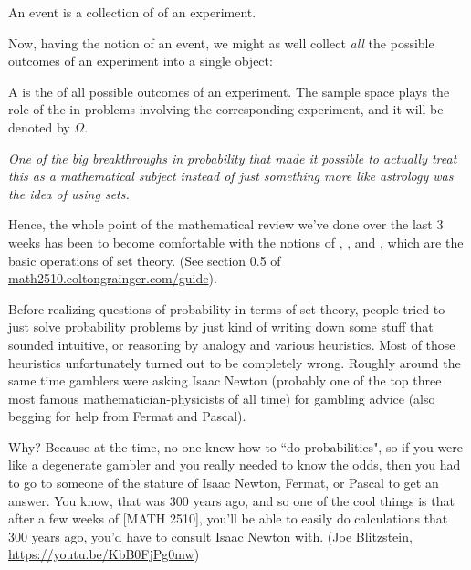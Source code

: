 \documentclass{ccg-topic}
\begin{document}
\begin{defn}[Event]
    An event is a collection of  of an experiment.
\end{defn}

Now, having the notion of an event, we might as well collect \emph{all} the possible outcomes of an experiment into a single object:

\begin{defn}
    \label{defn:sample_space}
    A  is the  of all possible outcomes of an experiment. The sample space plays the role of the  in problems involving the corresponding experiment, and it will be denoted by $\Omega$. 
\end{defn}

\begin{note}
    \emph{One of the big breakthroughs in probability that made it possible to actually treat this as a mathematical subject instead of just something more like astrology was the idea of using sets.}
\end{note}

Hence, the whole point of the mathematical review we've done over the last 3 weeks has been to become comfortable with the notions of , , and , which are the basic operations of set theory. (See section 0.5 of \url{math2510.coltongrainger.com/guide}).

\begin{note}
    {Before realizing questions of probability in terms of set theory, people tried to just solve probability problems by just kind of writing down some stuff that sounded intuitive, or reasoning by analogy and various heuristics. Most of those heuristics unfortunately turned out to be completely wrong. Roughly around the same time gamblers were asking Isaac Newton (probably one of the top three most famous mathematician-physicists of all time) for gambling advice (also begging for help from Fermat and Pascal).}

    {Why? Because at the time, no one knew how to ``do probabilities", so if you were like a degenerate gambler and you really needed to know the odds, then you had to go to someone of the stature of Isaac Newton, Fermat, or Pascal to get an answer. You know, that was 300 years ago, and so one of the cool things is that after a few weeks of [MATH 2510], you'll be able to easily do calculations that 300 years ago, you'd have to consult Isaac Newton with.}
    (Joe Blitzstein, \url{https://youtu.be/KbB0FjPg0mw})
\end{note}
\end{document}
